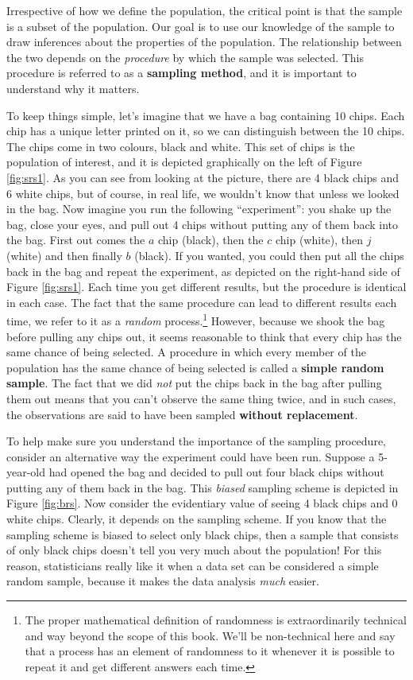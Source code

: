 \documentclass[
  11pt,
  a4paper,
  twoside,symmetric,openright]{book}
\theoremstyle{break}
\theoremstyle{break}
\begin{document}
Irrespective of how we define the population, the critical point is that the sample is a subset of the population. Our goal is to use our knowledge of the sample to draw inferences about the properties of the population. The relationship between the two depends on the \emph{procedure} by which the sample was selected. This procedure is referred to as a \textbf{sampling method}, and it is important to understand why it matters.

To keep things simple, let's imagine that we have a bag containing 10 chips. Each chip has a unique letter printed on it, so we can distinguish between the 10 chips. The chips come in two colours, black and white. This set of chips is the population of interest, and it is depicted graphically on the left of Figure \ref{fig:srs1}. As you can see from looking at the picture, there are 4 black chips and 6 white chips, but of course, in real life, we wouldn't know that unless we looked in the bag. Now imagine you run the following ``experiment'': you shake up the bag, close your eyes, and pull out 4 chips without putting any of them back into the bag. First out comes the \(a\) chip (black), then the \(c\) chip (white), then \(j\) (white) and then finally \(b\) (black). If you wanted, you could then put all the chips back in the bag and repeat the experiment, as depicted on the right-hand side of Figure \ref{fig:srs1}. Each time you get different results, but the procedure is identical in each case. The fact that the same procedure can lead to different results each time, we refer to it as a \emph{random} process.\footnote{The proper mathematical definition of randomness is extraordinarily technical and way beyond the scope of this book. We'll be non-technical here and say that a process has an element of randomness to it whenever it is possible to repeat it and get different answers each time.} However, because we shook the bag before pulling any chips out, it seems reasonable to think that every chip has the same chance of being selected. A procedure in which every member of the population has the same chance of being selected is called a \textbf{simple random sample}. The fact that we did \emph{not} put the chips back in the bag after pulling them out means that you can't observe the same thing twice, and in such cases, the observations are said to have been sampled \textbf{without replacement}.

To help make sure you understand the importance of the sampling procedure, consider an alternative way the experiment could have been run. Suppose a 5-year-old had opened the bag and decided to pull out four black chips without putting any of them back in the bag. This \emph{biased} sampling scheme is depicted in Figure \ref{fig:brs}. Now consider the evidentiary value of seeing 4 black chips and 0 white chips. Clearly, it depends on the sampling scheme. If you know that the sampling scheme is biased to select only black chips, then a sample that consists of only black chips doesn't tell you very much about the population! For this reason, statisticians really like it when a data set can be considered a simple random sample, because it makes the data analysis \emph{much} easier.
\end{document}

